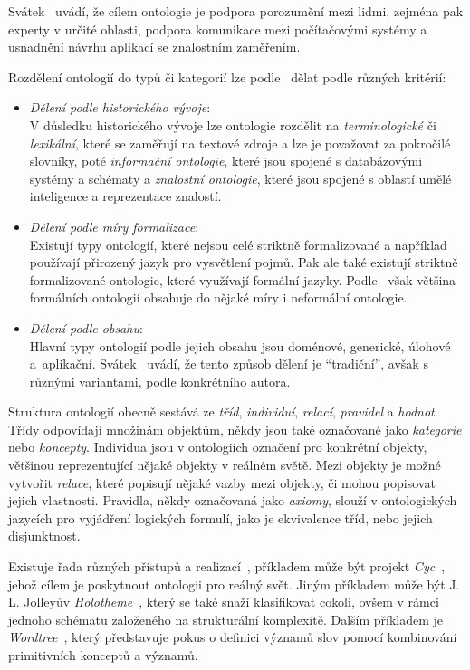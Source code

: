 Svátek~\cite{onto_svatek} uvádí, že cílem ontologie je podpora porozumění mezi lidmi, zejména pak experty v určité oblasti,
podpora komunikace mezi počítačovými systémy a usnadnění návrhu aplikací se znalostním zaměřením.

Rozdělení ontologií do typů či kategorií lze podle~\cite{onto_svatek} dělat podle různých kritérií:
\begin{itemize}
	\item \emph{Dělení podle historického vývoje}:\\
	      V důsledku historického vývoje lze ontologie rozdělit na \emph{terminologické} či \emph{lexikální}, které se zaměřují
	      na textové zdroje a lze je považovat za pokročilé slovníky, poté \emph{informační ontologie}, které jsou spojené s databázovými systémy a schématy
	      a \emph{znalostní ontologie}, které jsou spojené s oblastí umělé inteligence a reprezentace znalostí.
	\item \emph{Dělení podle míry formalizace}:\\
	      Existují typy ontologií, které nejsou celé striktně formalizované a například používají přirozený jazyk pro vysvětlení pojmů.
	      Pak ale také existují striktně formalizované ontologie, které využívají formální jazyky.
	      Podle~\cite{onto_svatek} však většina formálních ontologií obsahuje do nějaké míry i neformální ontologie.
	\item \emph{Dělení podle obsahu}:\\
	      Hlavní typy ontologií podle jejich obsahu jsou doménové, generické, úlohové a~aplikační.
	      Svátek~\cite{onto_svatek} uvádí, že tento způsob dělení je \enquote{tradiční}, avšak s různými variantami, podle konkrétního autora.
\end{itemize}

Struktura ontologií obecně sestává ze \emph{tříd}, \emph{individuí}, \emph{relací}, \emph{pravidel} a \emph{hodnot}.
Třídy odpovídají množinám objektům, někdy jsou také označované jako \emph{kategorie} nebo \emph{koncepty}.
Individua jsou v ontologiích označení pro konkrétní objekty, většinou reprezentující nějaké objekty v reálném světě.
Mezi objekty je možné vytvořit \emph{relace}, které popisují nějaké vazby mezi objekty, či mohou popisovat jejich vlastnosti.
Pravidla, někdy označovaná jako \emph{axiomy}, slouží v ontologických jazycích pro vyjádření logických formulí, jako je ekvivalence tříd, nebo jejich disjunktnost.~\cite{onto_svatek}

Existuje řada různých přístupů a realizací~\cite{semantic-nets-LEHMANN19921}, příkladem může být projekt \emph{Cyc}~\cite{cyc}, jehož cílem je poskytnout ontologii pro reálný svět.
Jiným příkladem může být J. L. Jolleyův \emph{Holotheme}~\cite{jolley1971holotheme}, který se také snaží klasifikovat cokoli,
ovšem v rámci jednoho schématu založeného na strukturální komplexitě.
Dalším příkladem je \emph{Wordtree}~\cite{burger1984wordtree}, který představuje pokus o definici významů slov pomocí kombinování primitivních konceptů a významů.

